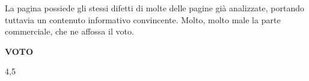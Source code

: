 La pagina possiede gli stessi difetti di molte delle pagine già analizzate, portando tuttavia un contenuto informativo convincente. Molto, molto male la parte commerciale, che ne affossa il voto.
\begin{center}
    \begin{Large}
    \textbf{VOTO}\\
    \vspace{0.1cm}
    \end{Large}
    \begin{huge}
    4,5
    \end{huge}
\end{center}